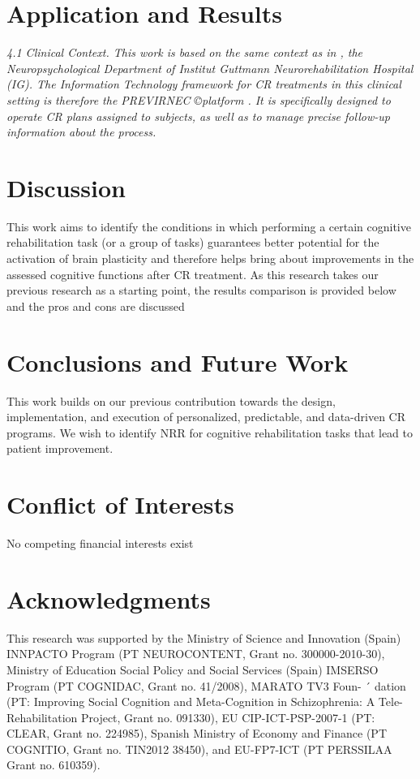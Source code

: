 {\section{Application and Results}
\label{sec3}
\textit{4.1 Clinical Context. This work is based on the same context
as in \cite{biblref12}, the Neuropsychological Department of Institut
Guttmann Neurorehabilitation Hospital (IG). The Information Technology framework for CR treatments in this clinical
setting is therefore the PREVIRNEC \copyright platform \cite{biblref31}. It is
specifically designed to operate CR plans assigned to subjects,
as well as to manage precise follow-up information about the
process.}

\section{Discussion}
\label{sec4}

This work aims to identify the conditions in which performing a certain cognitive rehabilitation task (or a group of
tasks) guarantees better potential for the activation of brain
plasticity and therefore helps bring about improvements in
the assessed cognitive functions after CR treatment. As this
research takes our previous research as a starting point, the
results comparison is provided below and the pros and cons
are discussed

\section*{Conclusions and Future Work}
\label{sec5}

This work builds on our previous contribution towards the
design, implementation, and execution of personalized, predictable, and data-driven CR programs. We wish to identify
NRR for cognitive rehabilitation tasks that lead to patient
improvement.
\section*{Conflict of Interests}
\label{sec6}
No competing financial interests exist
\section{Acknowledgments}
\label{sec7}

This research was supported by the Ministry of Science and
Innovation (Spain) INNPACTO Program (PT NEUROCONTENT, Grant no. 300000-2010-30), Ministry of Education
Social Policy and Social Services (Spain) IMSERSO Program
(PT COGNIDAC, Grant no. 41/2008), MARATO TV3 Foun- ´
dation (PT: Improving Social Cognition and Meta-Cognition
in Schizophrenia: A Tele-Rehabilitation Project, Grant no.
091330), EU CIP-ICT-PSP-2007-1 (PT: CLEAR, Grant no.
224985), Spanish Ministry of Economy and Finance (PT
COGNITIO, Grant no. TIN2012 38450), and EU-FP7-ICT
(PT PERSSILAA Grant no. 610359). }
